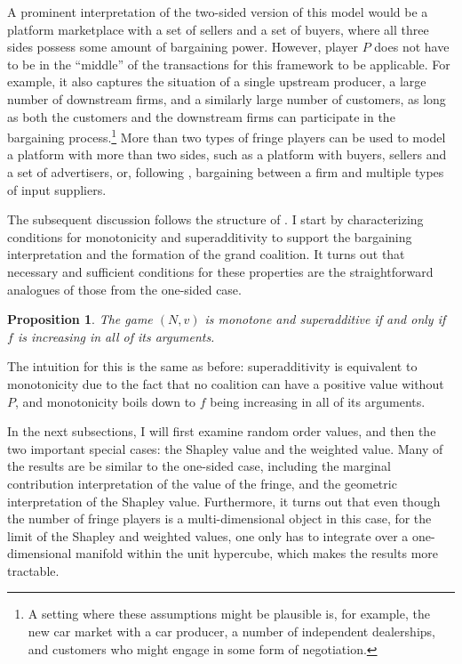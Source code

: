 \documentclass[a4paper]{article}
\newtheorem{proposition}{Proposition}
\begin{document}
A prominent interpretation of the two-sided version of this model would be a platform marketplace with a set of sellers and a set of buyers, where all three sides possess some amount of bargaining power.
However, player $P$ does not have to be in the ``middle'' of the transactions for this framework to be applicable.
For example, it also captures the situation of a single upstream producer, a large number of downstream firms, and a similarly large number of customers, as long as both the customers and the downstream firms can participate in the bargaining process.\footnote{
    A setting where these assumptions might be plausible is, for example, the new car market with a car producer, a number of independent dealerships, and customers who might engage in some form of negotiation.
}
More than two types of fringe players can be used to model a platform with more than two sides, such as a platform with buyers, sellers and a set of advertisers, or, following \textcite{stole1996intra}, bargaining between a firm and multiple types of input suppliers.

The subsequent discussion follows the structure of .
I start by characterizing conditions for monotonicity and superadditivity to support the bargaining interpretation and the formation of the grand coalition.
It turns out that necessary and sufficient conditions for these properties are the straightforward analogues of those from the one-sided case.
\begin{proposition}
    The game $(N, v)$ is monotone and superadditive if and only if $f$ is increasing in all of its arguments.
\end{proposition}
The intuition for this is the same as before: superadditivity is equivalent to monotonicity due to the fact that no coalition can have a positive value without $P$, and monotonicity boils down to $f$ being increasing in all of its arguments.

In the next subsections, I will first examine random order values, and then the two important special cases: the Shapley value and the weighted value.
Many of the results are be similar to the one-sided case, including the marginal contribution interpretation of the value of the fringe, and the geometric interpretation of the Shapley value.
Furthermore, it turns out that even though the number of fringe players is a multi-dimensional object in this case, for the limit of the Shapley and weighted values, one only has to integrate over a one-dimensional manifold within the unit hypercube, which makes the results more tractable.
\end{document}
